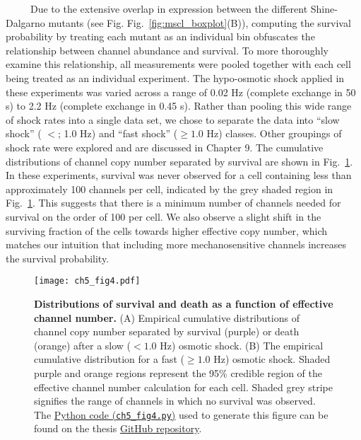 \documentclass[12pt]{caltech_thesis}
\begin{document}
~~~~~Due to the extensive overlap in expression between the different
Shine-Dalgarno mutants (see Fig. Fig.~\ref{fig:mscl_boxplot}(B)),
computing the survival probability by treating each mutant as an
individual bin obfuscates the relationship between channel abundance and
survival. To more thoroughly examine this relationship, all measurements
were pooled together with each cell being treated as an individual
experiment. The hypo-osmotic shock applied in these experiments was
varied across a range of 0.02 Hz (complete exchange in 50 s) to 2.2 Hz
(complete exchange in 0.45 s). Rather than pooling this wide range of
shock rates into a single data set, we chose to separate the data into
``slow shock'' ( \(<\); 1.0 Hz) and ``fast shock'' (\(\geq 1.0\) Hz)
classes. Other groupings of shock rate were explored and are discussed
in Chapter 9. The cumulative distributions of channel copy number
separated by survival are shown in Fig.~\ref{fig:survival_dists}. In
these experiments, survival was never observed for a cell containing
less than approximately 100 channels per cell, indicated by the grey
shaded region in Fig.~\ref{fig:survival_dists}. This suggests that there
is a minimum number of channels needed for survival on the order of 100
per cell. We also observe a slight shift in the surviving fraction of
the cells towards higher effective copy number, which matches our
intuition that including more mechanosensitive channels increases the
survival probability.

\hypertarget{fig:survival_dists}{%
\begin{figure}
\centering
\texttt{[image: ch5\_fig4.pdf]}
\caption[{Distributions of survival and death as a function of effective
MscL channel number.}]{\textbf{Distributions of survival and death as a
function of effective channel number.} (A) Empirical cumulative
distributions of channel copy number separated by survival (purple) or
death (orange) after a slow (\(< 1.0\) Hz) osmotic shock. (B) The
empirical cumulative distribution for a fast (\(\geq 1.0\) Hz) osmotic
shock. Shaded purple and orange regions represent the 95\% credible
region of the effective channel number calculation for each cell. Shaded
grey stripe signifies the range of channels in which no survival was
observed. The
\href{https://github.com/gchure/phd/blob/master/src/chapter_05/code/ch5_fig4.py}{Python
code (\texttt{ch5\_fig4.py})} used to generate this figure can be found
on the thesis \href{https://github.com/gchure/phd}{GitHub repository}.}
\label{fig:survival_dists}
\end{figure}
}
\end{document}
